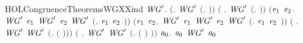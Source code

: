 \begin{SaveVerbatim}{HOLCongruenceTheoremsWGXXind}
\HOLTokenTurnstile{} \HOLSymConst{\HOLTokenForall{}}\ensuremath{\HOLBoundVar{WG}\sp{\prime}}.
       \ensuremath{(}\HOLSymConst{\HOLTokenForall{}}. \ensuremath{\HOLBoundVar{WG}\sp{\prime}} \ensuremath{(}\HOLTokenLambda{}. \ensuremath{)}\ensuremath{)} \HOLSymConst{\HOLTokenConj{}} \ensuremath{(}\HOLSymConst{\HOLTokenForall{}} .   \HOLSymConst{\HOLTokenImp{}} \ensuremath{\HOLBoundVar{WG}\sp{\prime}} \ensuremath{(}\HOLTokenLambda{}. \HOLSymConst{\ensuremath{\ldotp}} \ensuremath{)}\ensuremath{)} \HOLSymConst{\HOLTokenConj{}}
       \ensuremath{(}\HOLSymConst{\HOLTokenForall{}}\ensuremath{\HOLBoundVar{e}\sb{\mathrm{1}}} \ensuremath{\HOLBoundVar{e}\sb{\mathrm{2}}}. \ensuremath{\HOLBoundVar{WG}\sp{\prime}} \ensuremath{\HOLBoundVar{e}\sb{\mathrm{1}}} \HOLSymConst{\HOLTokenConj{}} \ensuremath{\HOLBoundVar{WG}\sp{\prime}} \ensuremath{\HOLBoundVar{e}\sb{\mathrm{2}}} \HOLSymConst{\HOLTokenImp{}} \ensuremath{\HOLBoundVar{WG}\sp{\prime}} \ensuremath{(}\HOLTokenLambda{}. \ensuremath{\HOLBoundVar{e}\sb{\mathrm{1}}}  \HOLSymConst{\ensuremath{+}} \ensuremath{\HOLBoundVar{e}\sb{\mathrm{2}}} \ensuremath{)}\ensuremath{)} \HOLSymConst{\HOLTokenConj{}}
       \ensuremath{(}\HOLSymConst{\HOLTokenForall{}}\ensuremath{\HOLBoundVar{e}\sb{\mathrm{1}}} \ensuremath{\HOLBoundVar{e}\sb{\mathrm{2}}}. \ensuremath{\HOLBoundVar{WG}\sp{\prime}} \ensuremath{\HOLBoundVar{e}\sb{\mathrm{1}}} \HOLSymConst{\HOLTokenConj{}} \ensuremath{\HOLBoundVar{WG}\sp{\prime}} \ensuremath{\HOLBoundVar{e}\sb{\mathrm{2}}} \HOLSymConst{\HOLTokenImp{}} \ensuremath{\HOLBoundVar{WG}\sp{\prime}} \ensuremath{(}\HOLTokenLambda{}. \ensuremath{\HOLBoundVar{e}\sb{\mathrm{1}}}  \HOLSymConst{\ensuremath{\mid}} \ensuremath{\HOLBoundVar{e}\sb{\mathrm{2}}} \ensuremath{)}\ensuremath{)} \HOLSymConst{\HOLTokenConj{}}
       \ensuremath{(}\HOLSymConst{\HOLTokenForall{}} . \ensuremath{\HOLBoundVar{WG}\sp{\prime}}  \HOLSymConst{\HOLTokenImp{}} \ensuremath{\HOLBoundVar{WG}\sp{\prime}} \ensuremath{(}\HOLTokenLambda{}.   \ensuremath{(} \ensuremath{)}\ensuremath{)}\ensuremath{)} \HOLSymConst{\HOLTokenConj{}}
       \ensuremath{(}\HOLSymConst{\HOLTokenForall{}} . \ensuremath{\HOLBoundVar{WG}\sp{\prime}}  \HOLSymConst{\HOLTokenImp{}} \ensuremath{\HOLBoundVar{WG}\sp{\prime}} \ensuremath{(}\HOLTokenLambda{}.  \ensuremath{(} \ensuremath{)} \ensuremath{)}\ensuremath{)} \HOLSymConst{\HOLTokenImp{}}
       \HOLSymConst{\HOLTokenForall{}}\ensuremath{\HOLBoundVar{a}\sb{\mathrm{0}}}.  \ensuremath{\HOLBoundVar{a}\sb{\mathrm{0}}} \HOLSymConst{\HOLTokenImp{}} \ensuremath{\HOLBoundVar{WG}\sp{\prime}} \ensuremath{\HOLBoundVar{a}\sb{\mathrm{0}}}
\end{SaveVerbatim}
